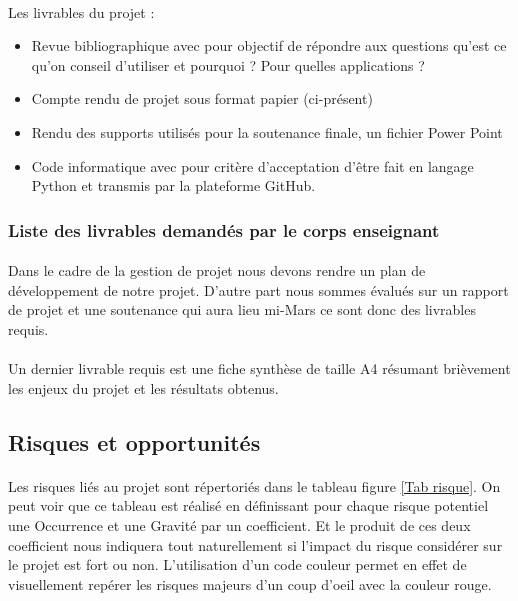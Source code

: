     \paragraph{}
    Les livrables du projet :
    \begin{itemize}
       	\item Revue bibliographique avec pour objectif de répondre aux questions qu'est ce qu'on conseil d'utiliser et pourquoi ? Pour quelles applications ?
       	\item Compte rendu de projet sous format papier (ci-présent)
       	\item Rendu des supports utilisés pour la soutenance finale, un fichier Power Point
       	\item  Code informatique avec pour critère d'acceptation d'être fait en langage Python et transmis par la plateforme GitHub.
    \end{itemize}

    \subsubsection{Liste des livrables demandés par le corps enseignant}
    \paragraph{}
    Dans le cadre de la gestion de projet nous devons rendre un plan de développement de notre projet. D'autre part nous sommes évalués sur un rapport de projet et une soutenance qui aura lieu mi-Mars ce sont donc des livrables requis.
    \paragraph{}
    Un dernier livrable requis est une fiche synthèse de taille A4 résumant brièvement les enjeux du projet et les résultats obtenus. 


\subsection{Risques et opportunités}
    \paragraph{}
    Les risques liés au projet sont répertoriés dans le tableau figure \ref{Tab risque}. On peut voir que ce tableau est réalisé en définissant pour chaque risque potentiel une Occurrence et une Gravité par un coefficient. Et le produit de ces deux coefficient nous indiquera tout naturellement si l'impact du risque considérer sur le projet est fort ou non. L'utilisation d'un code couleur permet en effet de visuellement repérer les risques majeurs d'un coup d'oeil avec la couleur rouge.
